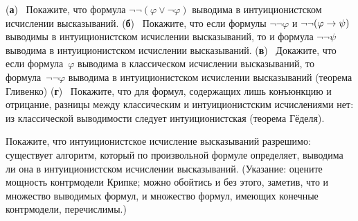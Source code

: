 \begin{problem}
        (\textbf{а})~%
Покажите, что формула $\lnot\lnot(\varphi\lor\lnot\varphi)$
выводима в интуиционистском исчислении высказываний.
        (\textbf{б})~%
Покажите, что если формулы $\lnot\lnot\varphi$ и $\lnot\lnot(\varphi\hm\to\psi)$
выводимы в интуиционистском исчислении высказываний, то и формула
$\lnot\lnot\psi$ выводима в интуиционистском исчислении высказываний.
        (\textbf{в})~%
Докажите, что если формула~$\varphi$ выводима в классическом
исчислении высказываний, то формула~$\lnot\lnot\varphi$ выводима
в интуиционистском исчислении высказываний (теорема Гливенко)%
%
        (\textbf{г})~%
Покажите, что для формул, содержащих лишь конъюнкцию и отрицание,
разницы между классическим и интуиционистским исчислениями нет:
из классической выводимости следует интуиционистская (теорема Гёделя).%
%
\end{problem}

\begin{problem}
Покажите, что интуиционистское исчисление высказываний разрешимо:
существует алгоритм, который по произвольной формуле определяет,
выводима ли она в интуиционистском исчислении высказываний.
(Указание: оцените мощность контрмодели Крипке; можно
обойтись и без этого, заметив, что и множество выводимых формул,
и множество формул, имеющих конечные контрмодели,
перечислимы.)
\end{problem}
